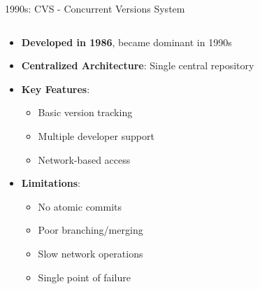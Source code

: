 \documentclass{beamer}
\begin{document}
\begin{frame}[t]{1990s: CVS - Concurrent Versions System}
\begin{columns}
    \begin{column}{0.6\textwidth}
        \begin{itemize}
            \item \textbf{Developed in 1986}, became dominant in 1990s
            \item \textbf{Centralized Architecture}: Single central repository
            \item \textbf{Key Features}:
                \begin{itemize}
                    \item Basic version tracking
                    \item Multiple developer support
                    \item Network-based access
                \end{itemize}
            \item \textbf{Limitations}:
                \begin{itemize}
                    \item No atomic commits
                    \item Poor branching/merging
                    \item Slow network operations
                    \item Single point of failure
                \end{itemize}
        \end{itemize}
    \end{column}
    \begin{column}{0.4\textwidth}

\end{column}
\end{columns}
\end{frame}
\end{document}
